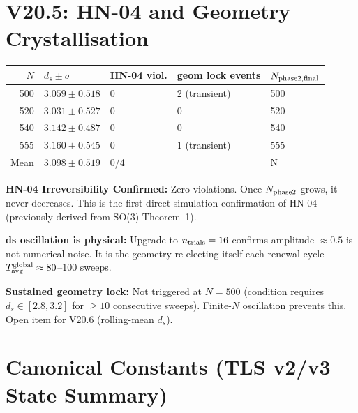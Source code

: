 \documentclass[12pt, a4paper]{article}
\begin{document}
\section{V20.5: HN-04 and Geometry Crystallisation}

\begin{derivedbox}[title={V20.5: Four-Run Confirmation (N $\in$ \{500,520,540,555\}, 1000 sweeps)}]
\begin{center}
\renewcommand{\arraystretch}{1.2}
\begin{tabular}{rllll}
\toprule
$N$ & $\bar{d}_s\pm\sigma$ & HN-04 viol. & geom lock events & $N_{\rm phase2,final}$ \\
\midrule
500 & $3.059\pm 0.518$ & 0 & 2 (transient) & 500 \\
520 & $3.031\pm 0.527$ & 0 & 0 & 520 \\
540 & $3.142\pm 0.487$ & 0 & 0 & 540 \\
555 & $3.160\pm 0.545$ & 0 & 1 (transient) & 555 \\
\midrule
Mean & $3.098\pm 0.519$ & 0/4 & & N \\
\bottomrule
\end{tabular}
\end{center}

\textbf{HN-04 Irreversibility Confirmed:} Zero violations. Once $N_{\rm phase2}$ grows, it never decreases. This is the first direct simulation confirmation of HN-04 (previously derived from SO(3) Theorem~1).

\textbf{ds oscillation is physical:} Upgrade to $n_{\rm trials} = 16$ confirms amplitude $\approx 0.5$ is not numerical noise. It is the geometry re-electing itself each renewal cycle $T_{\rm avg}^{\rm global} \approx 80$--$100$ sweeps.

\textbf{Sustained geometry lock:} Not triggered at $N=500$ (condition requires $d_s\in[2.8,3.2]$ for $\geq 10$ consecutive sweeps). Finite-$N$ oscillation prevents this. Open item for V20.6 (rolling-mean $d_s$).
\end{derivedbox}

\section{Canonical Constants (TLS v2/v3 State Summary)}
\end{document}

